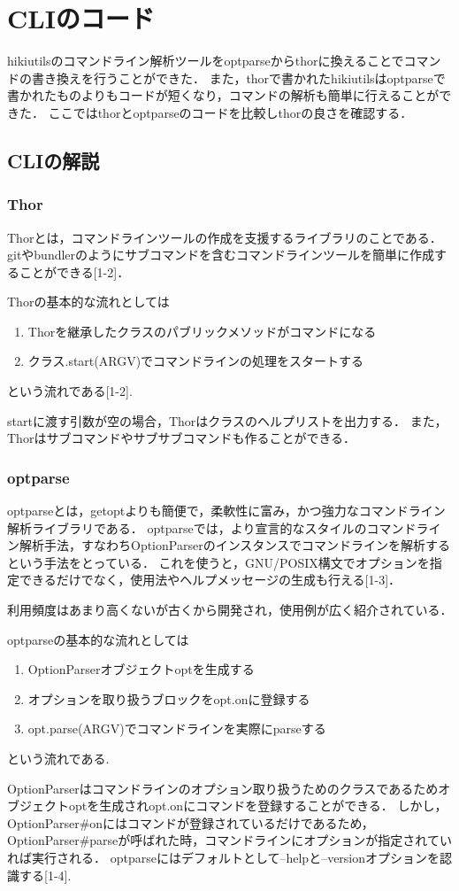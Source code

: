 
\section{CLIのコード}
hikiutilsのコマンドライン解析ツールをoptparseからthorに換えることでコマンドの書き換えを行うことができた．
また，thorで書かれたhikiutilsはoptparseで書かれたものよりもコードが短くなり，コマンドの解析も簡単に行えることができた．
ここではthorとoptparseのコードを比較しthorの良さを確認する．

\subsection{CLIの解説}
\subsubsection{Thor}
Thorとは，コマンドラインツールの作成を支援するライブラリのことである．
gitやbundlerのようにサブコマンドを含むコマンドラインツールを簡単に作成することができる[1-2]．

Thorの基本的な流れとしては

\begin{enumerate}
\item Thorを継承したクラスのパブリックメソッドがコマンドになる
\item クラス.start(ARGV)でコマンドラインの処理をスタートする
\end{enumerate}
という流れである[1-2].

startに渡す引数が空の場合，Thorはクラスのヘルプリストを出力する．
また，Thorはサブコマンドやサブサブコマンドも作ることができる．

\subsubsection{optparse}
optparseとは，getoptよりも簡便で，柔軟性に富み，かつ強力なコマンドライン解析ライブラリである．
optparseでは，より宣言的なスタイルのコマンドライン解析手法，すなわちOptionParserのインスタンスでコマンドラインを解析するという手法をとっている．
これを使うと，GNU/POSIX構文でオプションを指定できるだけでなく，使用法やヘルプメッセージの生成も行える[1-3]．

利用頻度はあまり高くないが古くから開発され，使用例が広く紹介されている．

optparseの基本的な流れとしては

\begin{enumerate}
\item OptionParserオブジェクトoptを生成する
\item オプションを取り扱うブロックをopt.onに登録する
\item opt.parse(ARGV)でコマンドラインを実際にparseする
\end{enumerate}
という流れである.

OptionParserはコマンドラインのオプション取り扱うためのクラスであるためオブジェクトoptを生成されopt.onにコマンドを登録することができる．
しかし，OptionParser\#onにはコマンドが登録されているだけであるため，OptionParser\#parseが呼ばれた時，コマンドラインにオプションが指定されていれば実行される．
optparseにはデフォルトとして--helpと--versionオプションを認識する[1-4].

